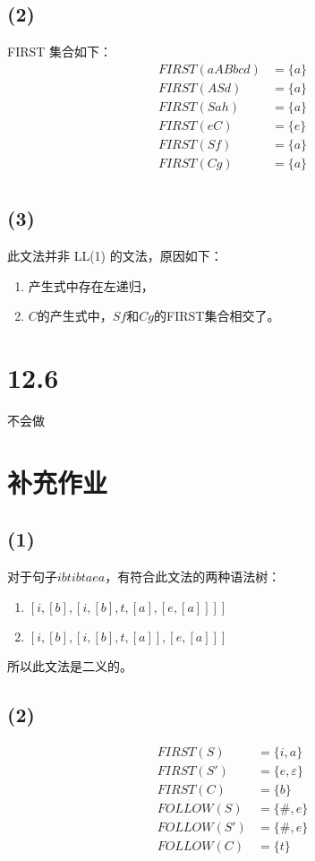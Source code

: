 \documentclass[UTF8]{ctexart}
\begin{document}
    \subsection*{(2)}
        FIRST 集合如下：
        \begin{align*}
            FIRST(aABbcd) &= \{a\} \\
            FIRST(ASd) &= \{a\} \\
            FIRST(Sah) &= \{a\} \\
            FIRST(eC) &= \{e\} \\
            FIRST(Sf) &= \{a\} \\
            FIRST(Cg) &= \{a\} \\
        \end{align*}

    \subsection*{(3)}
        此文法并非 LL(1) 的文法，原因如下：
        \begin{enumerate}
            \item 产生式中存在左递归，
            \item $C$的产生式中，$Sf$和$Cg$的FIRST集合相交了。
        \end{enumerate}

\section*{12.6}
    不会做

\section*{补充作业}
    \subsection*{(1)}
        对于句子$ibtibtaea$，有符合此文法的两种语法树：
        \begin{enumerate}
            \item $[i, [b], [i, [b], t, [a], [e, [a]]]]$
            \item $[i, [b], [i, [b], t, [a]], [e, [a]]]$
        \end{enumerate}
        所以此文法是二义的。

    \subsection*{(2)}
        \begin{align*}
            FIRST(S) &= \{i, a\} \\
            FIRST(S') &= \{e, \varepsilon\} \\
            FIRST(C) &= \{b\} \\
            FOLLOW(S) &= \{\#, e\} \\
            FOLLOW(S') &= \{\#, e\} \\
            FOLLOW(C) &= \{t\} 
        \end{align*}
    
\end{document}
